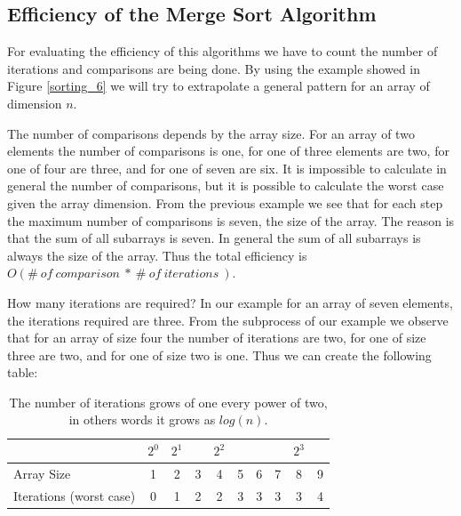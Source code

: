 \subsection{Efficiency of the Merge Sort Algorithm}
For evaluating the efficiency of this algorithms we have to count the number of iterations and comparisons are being done. By using the example showed in Figure \ref{sorting_6} we will try to extrapolate a general pattern for an array of dimension \(n\).

The number of comparisons depends by the array size. For an array of two elements the number of comparisons is one, for one of three elements are two, for one of four are three, and for one of seven are six. It is impossible to calculate in general the number of comparisons, but it is possible to calculate the worst case given the array dimension. From the previous example we see that for each step the maximum number of comparisons is seven, the size of the array. The reason is that the sum of all subarrays is seven. In general the sum of all subarrays is always the size of the array. Thus the total efficiency is \(O(\# \ of\ comparison \ * \ \# \ of \ iterations \ )\).

How many iterations are required? In our example for an array of seven elements, the iterations required are three. From the subprocess of our example we observe that for an array of size four the number of iterations are two, for one of size three are two, and for one of size two is one. Thus we can create the following table:

\begin{table}[h]
\caption[Merge Sort Efficiency]{The number of iterations grows of one every power of two, in others words it grows as \(log(n)\).}
\begin{tabular}{ | l | c | c | c | c | c | c | c | c | c |}
   
    \multicolumn{1}{l}{} & \multicolumn{1}{c}{\(2^{0}\)} & 
    \multicolumn{1}{c}{\(2^{1}\)} & \multicolumn{1}{c}{} &
    \multicolumn{1}{c}{\(2^{2}\)} & \multicolumn{1}{c}{} & 
    \multicolumn{1}{c}{} & \multicolumn{1}{c}{}          & 
    \multicolumn{1}{c}{\(2^{3}\)} & \multicolumn{1}{c}{} \\
    \hline
	Array Size & \cellcolor{LightCyan} 1 & \cellcolor{LightCyan} 2 & 3 & \cellcolor{LightCyan} 4 & 5  & 6 & 7 & \cellcolor{LightCyan} 8 & 9 \\
    \hline
	Iterations (worst case) & \cellcolor{LightCyan} 0 & \cellcolor{LightCyan} 1 & 2 & \cellcolor{LightCyan} 2 & 3 & 3 & 3 & \cellcolor{LightCyan} 3 & 4 \\
	\hline	
\end{tabular}
\end{table}

